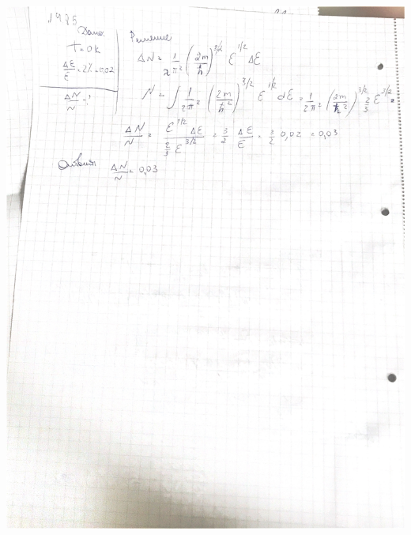 \documentclass[12pt]{article}
\begin{document}
\begin{center}
\includegraphics[scale=0.2]{5_2.jpeg}\\
\end{center}
\end{document}
